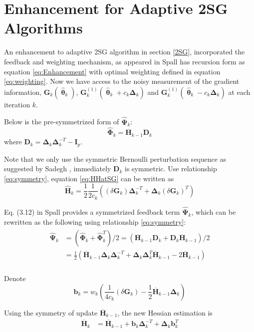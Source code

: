 \documentclass[conference]{IEEEtran}
\newcommand{\bD}{\bm{D}}
\newcommand{\bG}{\bm{G}}
\newcommand{\bI}{\bm{I}}
\newcommand{\bDelta}{\bm{\Delta}}
\newcommand{\oH}{\bm{\overline{H}}}
\newcommand{\hH}{\bm{\hat{H}}}
\newcommand{\hPsi}{\bm{\hat{\Psi}}}
\newcommand{\htheta}{\bm{\hat{\uptheta}}}
\newcommand{\hPhi}{\bm{\hat{\Phi}}}
\begin{document}
\section{Enhancement for Adaptive 2SG Algorithms} \label{Enhanced 2SG}
An enhancement to adaptive 2SG algorithm in section \ref{2SG}, incorporated the feedback and weighting mechanism, as appeared in Spall \cite{Spall2009} has recursion form as equation \ref{eq:Enhancement} with optimal weighting defined in equation \ref{eq:weighting}. Now we have access to the noisy measurement of the gradient information, $\bG_k(\htheta_k)$, $\bG_k^{(1)}(\htheta_k+ c_k\bDelta_k)$ and $\bG_k^{(1)}(\htheta_k- c_k\bDelta_k)$ at each iteration $k$.

Below is the pre-symmetrized form of $ \hPsi_k $:
\begin{equation}
\hPhi_k=\oH_{k-1}\bD_k
\end{equation}
where $ \bD_k=\bDelta_k\bDelta_k^{-T}-\bI_p$. 

Note that we only use the symmetric Bernoulli perturbation sequence as suggested by Sadegh \cite{Sadegh1998}, immediately $\bD_k$ is symmetric. Use relationship \ref{eq:symmetry}, equation \ref{eq:HHatSG} can be written as
\begin{equation} 
\hH_k=\frac{1}{2}\frac{1}{2c_k}\left( (\delta\bG_k)\bDelta_k^{-T}+\bDelta_k(\delta\bG_k)^{T} \right)
\end{equation}

Eq. (3.12) in Spall \cite{Spall2009} provides a symmetrized feedback term $ \hPsi_k $, which can be rewritten as the following using relationship \ref{eq:symmetry}:
\begin{align} 
\begin{split} 
\hPsi_k &=(\hPhi_k+\hPhi_k^T)/2=(\oH_{k-1}\bD_k+\bD_k\oH_{k-1})/2\\
&=\frac{1}{2}\left( \oH_{k-1}\bDelta_k\bDelta_k^{-T}+\bDelta_k\bDelta_k^{T}\oH_{k-1}-2\oH_{k-1} \right)\\
\end{split}
\end{align}

Denote
\begin{equation}
\bm{b}_k=w_k\left( \frac{1}{4c_k}(\delta\bG_k)-\frac{1}{2}\oH_{k-1}\bDelta_k\right)
\end{equation}


Using the symmetry of update $\oH_{k-1}$, the new Hessian estimation is
\begin{align*}
\oH_k&=\oH_{k-1}+\bm{b}_k\bDelta_k^{-T}+\bDelta_k\bm{b}_k^{T}
\end{align*}
\end{document}
